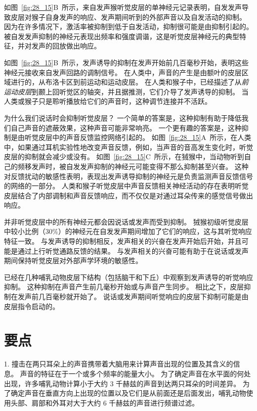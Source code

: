 如图~\ref{fig:28_15}B~所示，来自发声猴听觉皮层的单神经元记录表明，自发发声导致皮层对猴子自身发声的响应、发声期间听到的外部声音以及自发活动的抑制。
因为在许多情况下，激活率被抑制到低于自发活动，抑制很可能是由抑制引起的。
被自发发声抑制的神经元表现出频率和强度调谐，这是听觉皮层神经元的典型特征，并对发声的回放做出响应。


如图~\ref{fig:28_15}B~所示，发声诱导的抑制在发声开始前几百毫秒开始，表明这些神经元接收来自发声回路的调制信号。
在人类中，声音的产生是由额叶的皮层区域进行的，从布洛卡区到前运动和运动皮层。
在人类和猴子中，已经描述了从\textit{前运动皮层}到颞上回听觉区的轴突，并且据推测，它们介导了发声诱导的抑制。
当人类或猴子只是聆听播放给它们的声音时，这种调节连接并不活跃。


为什么我们说话时会抑制听觉皮层？
一个简单的答案是，这种抑制有助于降低我们自己声音的遮蔽效果，这种声音可能非常响亮。
一个更有趣的答案是，这种抑制是由听觉皮层中的声音反馈监控网络引起的。
如图~\ref{fig:28_15}A~所示，在人类中，如果通过耳机实验性地改变声音反馈，例如，当声音的音高发生变化时，听觉皮层的抑制就会减少或没有。
如图~\ref{fig:28_15}C~所示，在狨猴中，当动物听到自己的频移发声时，被自发发声抑制的神经元可能变得不那么抑制甚至兴奋。
这种对反馈扰动的敏感性表明，表现出发声诱导抑制的神经元是负责监测声音反馈信号的网络的一部分。
人类和猴子听觉皮层中声音反馈相关神经活动的存在表明听觉皮层结合了内部调制和声音反馈响应，而不仅仅是对通过耳朵传来的感觉信号做出响应。


并非听觉皮层中的所有神经元都会因说话或发声而受到抑制。
狨猴初级听觉皮层中较小比例（30\%）的神经元在自发发声期间增加了它们的响应，这与其听觉响应特征一致。
与发声诱导的抑制相反，发声相关的兴奋在发声开始后开始，并且可能是通过上行听觉通路反馈的结果。
与发声相关的兴奋可能有助于在说话或发声期间保持听觉皮层对外部声学环境的敏感性。


已经在几种哺乳动物皮层下结构（包括脑干和下丘）中观察到发声诱导的听觉响应抑制。
这种抑制在声音产生前几毫秒开始或与声音产生同步。
相比之下，皮层抑制在发声前几百毫秒就开始了。
说话或发声期间听觉响应的皮层下抑制可能是由皮层指令启动的。



\section{要点}

1. 撞击在两只耳朵上的声音携带着大脑用来计算声音出现的位置及其含义的信息。
声音的特征在于一个或多个频率的能量大小。
为了确定声音在水平面的何处出现，许多哺乳动物计算小于大约 3 千赫兹的声音到达两只耳朵的时间差异。
为了确定声音在垂直方向上出现的位置以及它们是从前面还是后面发出，哺乳动物使用头部、肩部和外耳对大于大约 6 千赫兹的声音进行频谱过滤。 


